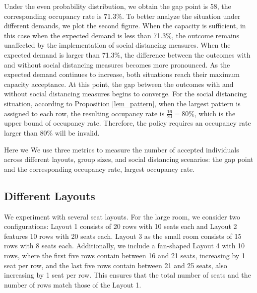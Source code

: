 Under the even probability distribution, we obtain the gap point is 58, the corresponding occupancy rate is 71.3\%. To better analyze the situation under different demands, we plot the second figure. When the capacity is sufficient, in this case when the expected demand is less than 71.3\%, the outcome remains unaffected by the implementation of social distancing measures. When the expected demand is larger than 71.3\%, the difference between the outcomes with and without social distancing measures becomes more pronounced. As the expected demand continues to increase, both situations reach their maximum capacity acceptance. At this point, the gap between the outcomes with and without social distancing measures begins to converge. For the social distancing situation, according to Proposition \ref{lem_pattern}, when the largest pattern is assigned to each row, the resulting occupancy rate is $\frac{16}{20} = 80\%$, which is the upper bound of occupancy rate. Therefore, the policy requires an occupancy rate larger than 80\% will be invalid.


Here we 
We use three metrics to measure the number of accepted individuals across different layouts, group sizes, and social distancing scenarios: the gap point and the corresponding occupancy rate, largest occupancy rate.

\subsection*{Different Layouts}
We experiment with several seat layouts. For the large room, we consider two configurations: Layout 1 consists of 20 rows with 10 seats each and Layout 2 features 10 rows with 20 seats each. Layout 3 as the small room consists of 15 rows with 8 seats each. Additionally, we include a fan-shaped Layout 4 with 10 rows, where the first five rows contain between 16 and 21 seats, increasing by 1 seat per row, and the last five rows contain between 21 and 25 seats, also increasing by 1 seat per row. This ensures that the total number of seats and the number of rows match those of the Layout 1.



